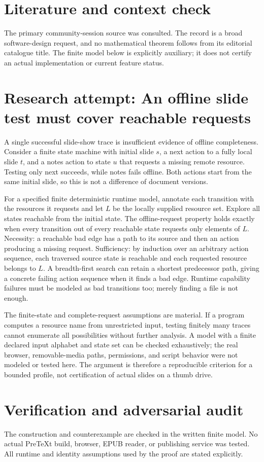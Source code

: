 \documentclass[11pt]{article}
\begin{document}
\section{Literature and context check}
The primary community-session source was consulted. The record is a broad software-design request, and no mathematical theorem follows from its editorial catalogue title. The finite model below is explicitly auxiliary; it does not certify an actual implementation or current feature status.
\section{Research attempt: An offline slide test must cover reachable requests}
A single successful slide-show trace is insufficient evidence of offline completeness. Consider a finite state machine with initial slide $s$, a next action to a fully local slide $t$, and a notes action to state $u$ that requests a missing remote resource. Testing only next succeeds, while notes fails offline. Both actions start from the same initial slide, so this is not a difference of document versions.

For a specified finite deterministic runtime model, annotate each transition with the resources it requests and let $L$ be the locally supplied resource set. Explore all states reachable from the initial state. The offline-request property holds exactly when every transition out of every reachable state requests only elements of $L$. Necessity: a reachable bad edge has a path to its source and then an action producing a missing request. Sufficiency: by induction over an arbitrary action sequence, each traversed source state is reachable and each requested resource belongs to $L$. A breadth-first search can retain a shortest predecessor path, giving a concrete failing action sequence when it finds a bad edge. Runtime capability failures must be modeled as bad transitions too; merely finding a file is not enough.

The finite-state and complete-request assumptions are material. If a program computes a resource name from unrestricted input, testing finitely many traces cannot enumerate all possibilities without further analysis. A model with a finite declared input alphabet and state set can be checked exhaustively; the real browser, removable-media paths, permissions, and script behavior were not modeled or tested here. The argument is therefore a reproducible criterion for a bounded profile, not certification of actual slides on a thumb drive.
\section{Verification and adversarial audit}
The construction and counterexample are checked in the written finite model. No actual PreTeXt build, browser, EPUB reader, or publishing service was tested. All runtime and identity assumptions used by the proof are stated explicitly.
\end{document}
